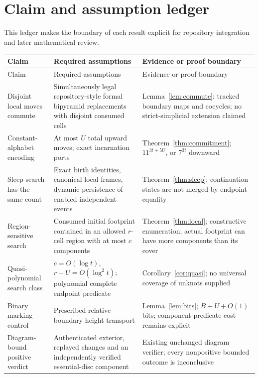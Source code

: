 \section{Claim and assumption ledger}\label{sec:ledger}

This ledger makes the boundary of each result explicit for repository
integration and later mathematical review.

\begingroup\small
\begin{longtable}{@{}>{\raggedright\arraybackslash}p{}>{\raggedright\arraybackslash}p{}>{\raggedright\arraybackslash}p{}@{}}
\toprule
Claim & Required assumptions & Evidence or proof boundary\\
\midrule
\endfirsthead
\toprule
Claim & Required assumptions & Evidence or proof boundary\\
\midrule
\endhead
Disjoint local moves commute & Simultaneously legal repository-style formal bipyramid replacements with disjoint consumed cells & Lemma~\ref{lem:commute}; tracked boundary maps and cocycles; no strict-simplicial extension claimed\\[0.45em]
Constant-alphabet encoding & At most $U$ total upward moves; exact incarnation ports & Theorem~\ref{thm:commitment}; $11^{3t+5U}$, or $7^{3t}$ downward\\[0.45em]
Sleep search has the same count & Exact birth identities, canonical local frames, dynamic persistence of enabled independent events & Theorem~\ref{thm:sleep}; continuation states are not merged by endpoint equality\\[0.45em]
Region-sensitive search & Consumed initial footprint contained in an allowed $r$-cell region with at most $c$ components & Theorem~\ref{thm:local}; constructive enumeration; actual footprint can have more components than its cover\\[0.45em]
Quasi-polynomial search class & $c=O(\log t)$, $r+U=O(\log^2t)$; polynomial complete endpoint predicate & Corollary~\ref{cor:quasi}; no universal coverage of unknots supplied\\[0.45em]
Binary marking control & Prescribed relative-boundary height transport & Lemma~\ref{lem:bits}; $B+U+O(1)$ bits; component-predicate cost remains explicit\\[0.45em]
Diagram-bound positive verdict & Authenticated exterior, replayed changes and an independently verified essential-disc component & Existing unchanged diagram verifier; every nonpositive bounded outcome is inconclusive\\[0.45em]

\end{longtable}
